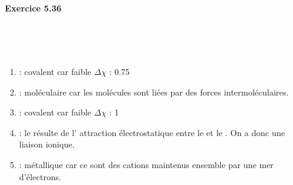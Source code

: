 \documentclass{article}
\newcommand\exercice[1]{%
\paragraph{#1}%
~\par
~\par}
\begin{document}
\exercice{Exercice 5.36}

\begin{enumerate}\renewcommand{\theenumi}{\alph{enumi}}
	\item	{} : covalent car faible $\Delta \chi$ : 0.75
	\item	{} : moléculaire car les molécules sont liées par des forces intermoléculaires.
	\item	{} : covalent car faible $\Delta \chi$ : 1
	\item	{} : le  résulte de l'
				attraction électrostatique entre le 
				et le . On a donc une liaison ionique.
	\item	{} : métallique car ce sont des cations maintenus ensemble par une mer d'électrons.
\end{enumerate}	
				
\end{document}
